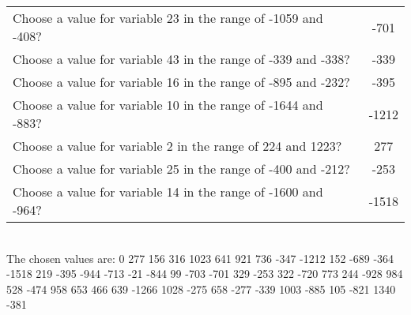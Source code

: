 \documentclass[10pt,a4paper]{article}
\begin{document}
\begin{appendix}
\begin{tabular}{ l  c }
\\Choose a value for variable 23 in the range of -1059 and -408? & -701
\\Choose a value for variable 43 in the range of -339 and -338? & -339
\\Choose a value for variable 16 in the range of -895 and -232? & -395
\\Choose a value for variable 10 in the range of -1644 and -883? & -1212
\\Choose a value for variable 2 in the range of 224 and 1223? & 277
\\Choose a value for variable 25 in the range of -400 and -212? & -253
\\Choose a value for variable 14 in the range of -1600 and -964? & -1518
\end{tabular}
\\ \phantom{i} The chosen values are: 0   277   156   316  1023   641   921   736  -347 -1212   152  -689  -364 -1518   219  -395  -944  -713   -21  -844    99  -703  -701   329  -253   322  -720   773   244  -928   984   528  -474   958   653   466   639 -1266  1028  -275   658  -277  -339  1003  -885   105  -821  1340  -381
\end{appendix}
\end{document}
